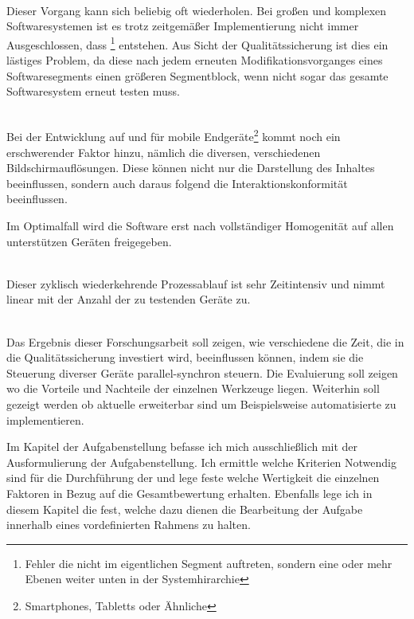 \\Dieser Vorgang kann sich beliebig oft wiederholen. Bei großen und komplexen Softwaresystemen ist es trotz zeitgemäßer Implementierung nicht immer Ausgeschlossen, dass \footnote{Fehler die nicht im eigentlichen Segment auftreten, sondern eine oder mehr Ebenen weiter unten in der Systemhirarchie} entstehen. Aus Sicht der Qualitätssicherung ist dies ein lästiges Problem, da diese nach jedem erneuten Modifikationsvorganges eines Softwaresegments einen größeren Segmentblock, wenn nicht sogar das gesamte Softwaresystem erneut testen muss.

\\Bei der Entwicklung auf und für mobile Endgeräte\footnote{Smartphones, Tabletts  oder Ähnliche} kommt noch ein erschwerender Faktor hinzu, nämlich die diversen, verschiedenen Bildschirmauflösungen. Diese können nicht nur die Darstellung des Inhaltes beeinflussen, sondern auch daraus folgend die Interaktionskonformität beeinflussen.


Im Optimalfall wird die Software erst nach vollständiger Homogenität auf allen unterstützen Geräten freigegeben.

\\Dieser zyklisch wiederkehrende Prozessablauf ist sehr Zeitintensiv und nimmt linear mit der Anzahl der zu testenden Geräte zu.

\\Das Ergebnis dieser Forschungsarbeit soll zeigen, wie verschiedene  die Zeit, die in die Qualitätssicherung investiert wird, beeinflussen können, indem sie die Steuerung diverser Geräte parallel-synchron steuern. Die Evaluierung soll zeigen wo die Vorteile und Nachteile der einzelnen Werkzeuge liegen. Weiterhin soll gezeigt werden ob aktuelle  erweiterbar sind um Beispielsweise automatisierte  zu implementieren. 

\pagebreak
Im Kapitel der Aufgabenstellung befasse ich mich ausschließlich mit der Ausformulierung der Aufgabenstellung. Ich ermittle welche Kriterien Notwendig sind für die Durchführung der  und lege feste welche Wertigkeit die einzelnen Faktoren in Bezug auf die Gesamtbewertung erhalten. Ebenfalls lege ich in diesem Kapitel die  fest, welche dazu dienen die Bearbeitung der Aufgabe innerhalb eines vordefinierten Rahmens zu halten.

